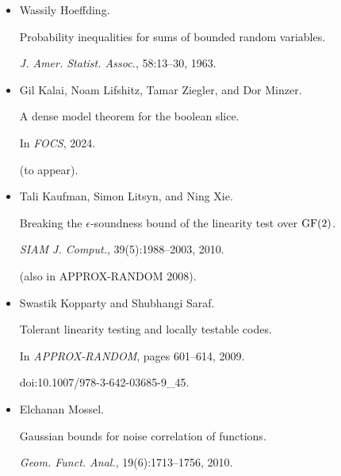 \begin{itemize}
(also in APPROX-RANDOM 2003, 2005).


doi:10.1137/050645804.





\item[] 
[21]

Wassily Hoeffding.


Probability inequalities for sums of bounded random variables.


\emph{J. Amer. Statist. Assoc.}, 58:13–30, 1963.





\item[] 
[22]

Gil Kalai, Noam Lifshitz, Tamar Ziegler, and Dor Minzer.


A dense model theorem for the boolean slice.


In \emph{FOCS}, 2024.


(to appear).





\item[] 
[23]

Tali Kaufman, Simon Litsyn, and Ning Xie.


Breaking the $\epsilon$-soundness bound of the linearity test over
$\rm GF(2)$.


\emph{SIAM J. Comput.}, 39(5):1988–2003, 2010.


(also in APPROX-RANDOM 2008).





\item[] 
[24]

Swastik Kopparty and Shubhangi Saraf.


Tolerant linearity testing and locally testable codes.


In \emph{APPROX-RANDOM}, pages 601–614, 2009.


doi:10.1007/978-3-642-03685-9\_45.





\item[] 
[25]

Elchanan Mossel.


Gaussian bounds for noise correlation of functions.


\emph{Geom. Funct. Anal.}, 19(6):1713–1756, 2010.






\end{itemize}

